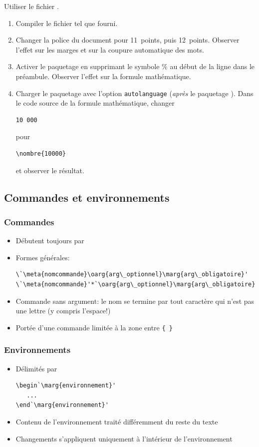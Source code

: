 \begin{exercice}
  Utiliser le fichier .

  \begin{enumerate}
  \item Compiler le fichier tel que fourni.
  \item Changer la police du document pour 11~points, puis 12~points.
    Observer l'effet sur les marges et sur la coupure automatique des
    mots.
  \item Activer le paquetage  en supprimant le symbole \%
    au début de la ligne dans le préambule. Observer l'effet sur la
    formule mathématique.
  \item Charger le paquetage  avec l'option
    \verb=autolanguage= (\emph{après} le paquetage ). Dans
    le code source de la formule mathématique, changer
\begin{lstlisting}
10 000
\end{lstlisting}
    pour
\begin{lstlisting}
\nombre{10000}
\end{lstlisting}
    et observer le résultat.
  \end{enumerate}
\end{exercice}

\subsection{Commandes et environnements}

\begin{frame}[fragile=singleslide]
  \frametitle{Commandes}
  \begin{itemize}
  \item Débutent toujours par \bs
  \item Formes générales:
\begin{lstlisting}
\`\meta{nomcommande}\oarg{arg\_optionnel}\marg{arg\_obligatoire}'
\`\meta{nomcommande}'*`\oarg{arg\_optionnel}\marg{arg\_obligatoire}'
\end{lstlisting}
   \item Commande sans argument: le nom se termine par tout
    caractère qui n'est pas une lettre (y compris l'espace!)
  \item Portée d'une commande limitée à la zone entre \verb={ }=
  \end{itemize}
\end{frame}

\begin{frame}[fragile=singleslide]
  \frametitle{Environnements}
  \begin{itemize}
  \item Délimités par
\begin{lstlisting}
\begin`\marg{environnement}'
   ...
\end`\marg{environnement}'
    \end{lstlisting}
  \item Contenu de l'environnement traité différemment du reste du texte
  \item Changements s'appliquent uniquement à l'intérieur de
    l'environnement
  \end{itemize}
\end{frame}

